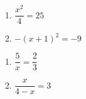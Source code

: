 \documentclass[11pt]{article}
\begin{document}
\begin{multicols}{2}
\begin{enumerate}
\setcounter{enumi}{\theenumCount}
\item $\dfrac{x^2}{4} = 25$ 

\item $-(x+1)^2 = -9$ 
\setcounter{enumCount}{\theenumi}
\end{enumerate}
\end{multicols}
\vfill


\begin{multicols}{2}
\begin{enumerate}
\setcounter{enumi}{\theenumCount}
\item $\dfrac{5}{x} = \dfrac{2}{3}$ 

\item $\dfrac{x}{4-x} = 3$ 
\setcounter{enumCount}{\theenumi}
\end{enumerate}
\end{multicols}
\vfill
\end{document}
